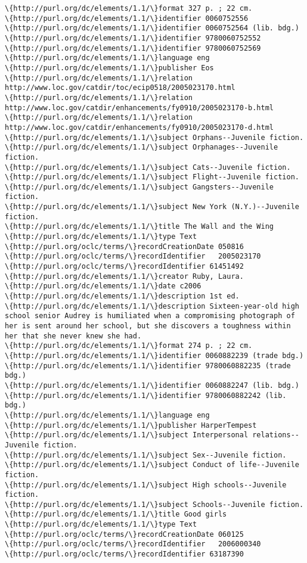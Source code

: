 \documentclass[11pt]{article}
\begin{document}
\begin{Verbatim}[commandchars=\\\{\}]
\{http://purl.org/dc/elements/1.1/\}format 327 p. ; 22 cm.
\{http://purl.org/dc/elements/1.1/\}identifier 0060752556
\{http://purl.org/dc/elements/1.1/\}identifier 0060752564 (lib. bdg.)
\{http://purl.org/dc/elements/1.1/\}identifier 9780060752552
\{http://purl.org/dc/elements/1.1/\}identifier 9780060752569
\{http://purl.org/dc/elements/1.1/\}language eng
\{http://purl.org/dc/elements/1.1/\}publisher Eos
\{http://purl.org/dc/elements/1.1/\}relation http://www.loc.gov/catdir/toc/ecip0518/2005023170.html
\{http://purl.org/dc/elements/1.1/\}relation http://www.loc.gov/catdir/enhancements/fy0910/2005023170-b.html
\{http://purl.org/dc/elements/1.1/\}relation http://www.loc.gov/catdir/enhancements/fy0910/2005023170-d.html
\{http://purl.org/dc/elements/1.1/\}subject Orphans--Juvenile fiction.
\{http://purl.org/dc/elements/1.1/\}subject Orphanages--Juvenile fiction.
\{http://purl.org/dc/elements/1.1/\}subject Cats--Juvenile fiction.
\{http://purl.org/dc/elements/1.1/\}subject Flight--Juvenile fiction.
\{http://purl.org/dc/elements/1.1/\}subject Gangsters--Juvenile fiction.
\{http://purl.org/dc/elements/1.1/\}subject New York (N.Y.)--Juvenile fiction.
\{http://purl.org/dc/elements/1.1/\}title The Wall and the Wing 
\{http://purl.org/dc/elements/1.1/\}type Text
\{http://purl.org/oclc/terms/\}recordCreationDate 050816
\{http://purl.org/oclc/terms/\}recordIdentifier   2005023170
\{http://purl.org/oclc/terms/\}recordIdentifier 61451492
\{http://purl.org/dc/elements/1.1/\}creator Ruby, Laura.
\{http://purl.org/dc/elements/1.1/\}date c2006
\{http://purl.org/dc/elements/1.1/\}description 1st ed.
\{http://purl.org/dc/elements/1.1/\}description Sixteen-year-old high school senior Audrey is humiliated when a compromising photograph of her is sent around her school, but she discovers a toughness within her that she never knew she had.
\{http://purl.org/dc/elements/1.1/\}format 274 p. ; 22 cm.
\{http://purl.org/dc/elements/1.1/\}identifier 0060882239 (trade bdg.)
\{http://purl.org/dc/elements/1.1/\}identifier 9780060882235 (trade bdg.)
\{http://purl.org/dc/elements/1.1/\}identifier 0060882247 (lib. bdg.)
\{http://purl.org/dc/elements/1.1/\}identifier 9780060882242 (lib. bdg.)
\{http://purl.org/dc/elements/1.1/\}language eng
\{http://purl.org/dc/elements/1.1/\}publisher HarperTempest
\{http://purl.org/dc/elements/1.1/\}subject Interpersonal relations--Juvenile fiction.
\{http://purl.org/dc/elements/1.1/\}subject Sex--Juvenile fiction.
\{http://purl.org/dc/elements/1.1/\}subject Conduct of life--Juvenile fiction.
\{http://purl.org/dc/elements/1.1/\}subject High schools--Juvenile fiction.
\{http://purl.org/dc/elements/1.1/\}subject Schools--Juvenile fiction.
\{http://purl.org/dc/elements/1.1/\}title Good girls 
\{http://purl.org/dc/elements/1.1/\}type Text
\{http://purl.org/oclc/terms/\}recordCreationDate 060125
\{http://purl.org/oclc/terms/\}recordIdentifier   2006000340
\{http://purl.org/oclc/terms/\}recordIdentifier 63187390

    \end{Verbatim}
\end{document}
